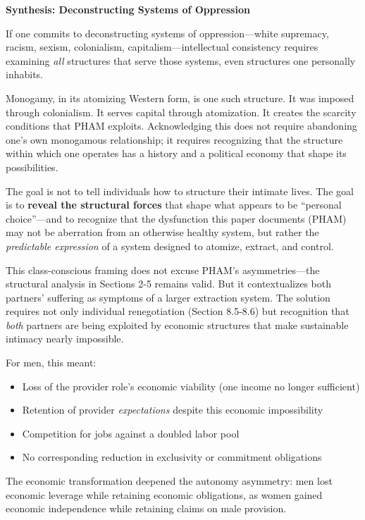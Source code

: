 \documentclass[12pt, letterpaper]{article}
\begin{document}
\textbf{Synthesis: Deconstructing Systems of Oppression}

If one commits to deconstructing systems of oppression---white supremacy, racism, sexism, colonialism, capitalism---intellectual consistency requires examining \textit{all} structures that serve those systems, even structures one personally inhabits.

Monogamy, in its atomizing Western form, is one such structure. It was imposed through colonialism. It serves capital through atomization. It creates the scarcity conditions that PHAM exploits. Acknowledging this does not require abandoning one's own monogamous relationship; it requires recognizing that the structure within which one operates has a history and a political economy that shape its possibilities.

The goal is not to tell individuals how to structure their intimate lives. The goal is to \textbf{reveal the structural forces} that shape what appears to be ``personal choice''---and to recognize that the dysfunction this paper documents (PHAM) may not be aberration from an otherwise healthy system, but rather the \textit{predictable expression} of a system designed to atomize, extract, and control.

This class-conscious framing does not excuse PHAM's asymmetries---the structural analysis in Sections 2-5 remains valid. But it contextualizes both partners' suffering as symptoms of a larger extraction system. The solution requires not only individual renegotiation (Section 8.5-8.6) but recognition that \textit{both} partners are being exploited by economic structures that make sustainable intimacy nearly impossible.

For men, this meant:
\begin{itemize}
    \item Loss of the provider role's economic viability (one income no longer sufficient)
    \item Retention of provider \textit{expectations} despite this economic impossibility
    \item Competition for jobs against a doubled labor pool
    \item No corresponding reduction in exclusivity or commitment obligations
\end{itemize}

The economic transformation deepened the autonomy asymmetry: men lost economic leverage while retaining economic obligations, as women gained economic independence while retaining claims on male provision.
\end{document}
